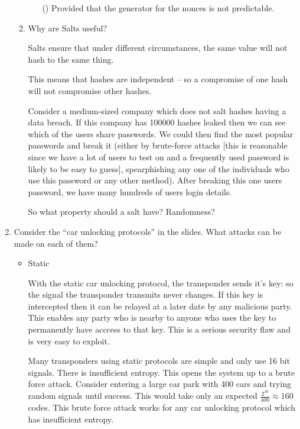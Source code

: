 \documentclass[10pt,\jkfside,a4paper]{article}
\begin{document}
\begin{enumerate}
\begin{enumerate}
\begin{itemize}

\item [(\dag)] Provided that the generator for the nonces is not predictable.

\end{itemize} 

\item Why are Salts useful?

Salts ensure that under different circumstances, the same value will not hash to the same thing. 

This means that hashes are independent -- so a compromise of one hash will not 
compromise other hashes.

Consider a medium-sized company which does not salt hashes having a data breach. If this company 
has 100000 hashes leaked then we can see which of the users share passwords. We could then 
find the most popular passwords and break it (either by brute-force attacks [this is reasonable since 
we have a lot of users to test on and a frequently used password is likely to be easy to guess], 
spearphishing any one of the individuals who use this password or 
any other method). After breaking this one users password, we have many hundreds of users login 
details.

{\color{blue} So what property should a salt have? Randomness?}

\end{enumerate}

\item Consider the ``car unlocking protocols'' in the slides. What attacks can be made on each of them?

\begin{itemize}

\item Static

With the static car unlocking protocol, the transponder sends it's key: so the signal the transponder 
transmits never changes. If this key is intercepted then it can be relayed at a 
later date by any malicious party. This enables any party who is nearby to anyone who uses the key to 
permanently have acccess to that key. This is a serious security flaw and is very easy to exploit.

Many transponders using static protocols are simple and only use 16 bit signals. 
There is insufficient entropy. This opens the system up to a brute force attack. Consider 
entering a large car park with 400 cars and trying random signals until success. This 
would take only an expected $\frac{2^{16}}{400} \approx 160$ codes. This brute force attack 
works for any car unlocking protocol which has insufficient entropy.


\end{itemize}
\end{enumerate}
\end{document}
